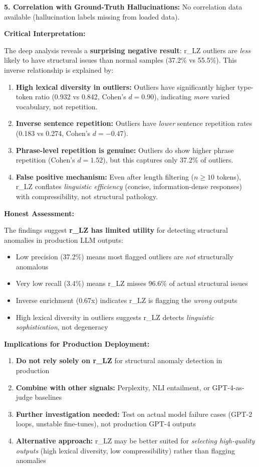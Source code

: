 \documentclass[11pt]{article}
\begin{document}
\textbf{5. Correlation with Ground-Truth Hallucinations:}
No correlation data available (hallucination labels missing from loaded data).

\textbf{Critical Interpretation:}

The deep analysis reveals a \textbf{surprising negative result}: r\_LZ outliers are \textit{less} likely to have structural issues than normal samples (37.2\% vs 55.5\%). This inverse relationship is explained by:

\begin{enumerate}
\item \textbf{High lexical diversity in outliers:} Outliers have significantly higher type-token ratio (0.932 vs 0.842, Cohen's $d=0.90$), indicating \textit{more} varied vocabulary, not repetition.
\item \textbf{Inverse sentence repetition:} Outliers have \textit{lower} sentence repetition rates (0.183 vs 0.274, Cohen's $d=-0.47$).
\item \textbf{Phrase-level repetition is genuine:} Outliers do show higher phrase repetition (Cohen's $d=1.52$), but this captures only 37.2\% of outliers.
\item \textbf{False positive mechanism:} Even after length filtering ($n \geq 10$ tokens), r\_LZ conflates \textit{linguistic efficiency} (concise, information-dense responses) with compressibility, not structural pathology.
\end{enumerate}

\textbf{Honest Assessment:}

The findings suggest \textbf{r\_LZ has limited utility} for detecting structural anomalies in production LLM outputs:
\begin{itemize}
\item Low precision (37.2\%) means most flagged outliers are \textit{not} structurally anomalous
\item Very low recall (3.4\%) means r\_LZ misses 96.6\% of actual structural issues
\item Inverse enrichment (0.67x) indicates r\_LZ is flagging the \textit{wrong} outputs
\item High lexical diversity in outliers suggests r\_LZ detects \textit{linguistic sophistication}, not degeneracy
\end{itemize}

\textbf{Implications for Production Deployment:}
\begin{enumerate}
\item \textbf{Do not rely solely on r\_LZ} for structural anomaly detection in production
\item \textbf{Combine with other signals:} Perplexity, NLI entailment, or GPT-4-as-judge baselines
\item \textbf{Further investigation needed:} Test on actual model failure cases (GPT-2 loops, unstable fine-tunes), not production GPT-4 outputs
\item \textbf{Alternative approach:} r\_LZ may be better suited for \textit{selecting high-quality outputs} (high lexical diversity, low compressibility) rather than flagging anomalies
\end{enumerate}
\end{document}
